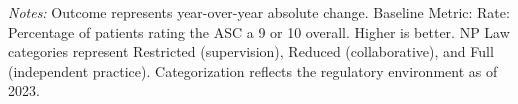 \begin{table}[htbp]
    \centering
    \caption{Summary of Change in OAS CAHPS: Rating 9 or 10 by Authority and Year}
    \label{tab:d_oas_rating_9_10}
    \vspace{0.2cm}
    \vspace{0.1cm}
    \begin{minipage}{\textwidth}
        \footnotesize \textit{Notes:} Outcome represents year-over-year absolute change. Baseline Metric: Rate: Percentage of patients rating the ASC a 9 or 10 overall. Higher is better. NP Law categories represent Restricted (supervision), Reduced (collaborative), and Full (independent practice). Categorization reflects the regulatory environment as of 2023.
    \end{minipage}
\end{table}
